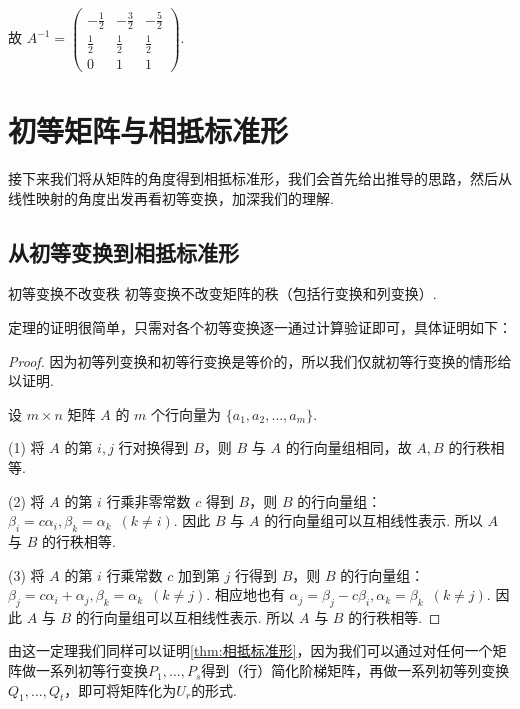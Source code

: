 \begin{solution}
    故 $A^{-1} =
        \begin{pmatrix}
            -\frac{1}{2} & -\frac{3}{2} & -\frac{5}{2} \\
            \frac{1}{2}  & \frac{1}{2}  & \frac{1}{2}  \\
            0            & 1            & 1
        \end{pmatrix}$.
\end{solution}

\section{初等矩阵与相抵标准形}

接下来我们将从矩阵的角度得到相抵标准形，我们会首先给出推导的思路，然后从线性映射的角度出发再看初等变换，加深我们的理解.

\subsection{从初等变换到相抵标准形}

\begin{theorem}{}{初等变换不改变秩}
    初等变换不改变矩阵的秩（包括行变换和列变换）.
\end{theorem}

定理的证明很简单，只需对各个初等变换逐一通过计算验证即可，具体证明如下：

\begin{proof}
    因为初等列变换和初等行变换是等价的，所以我们仅就初等行变换的情形给以证明.

    设 $m\times n$ 矩阵 $A$ 的 $m$ 个行向量为 $\{ a_1, a_2, \dots, a_m \}$.

    (1) 将 $A$ 的第 $i, j$ 行对换得到 $B$，则 $B$ 与 $A$ 的行向量组相同，故 $A, B$ 的行秩相等.

    (2) 将 $A$ 的第 $i$ 行乘非零常数 $c$ 得到 $B$，则 $B$ 的行向量组：$\beta_i = c\alpha_i, \beta_k = \alpha_k \enspace (k \neq i)$. 因此 $B$ 与 $A$ 的行向量组可以互相线性表示. 所以 $A$ 与 $B$ 的行秩相等.

    (3) 将 $A$ 的第 $i$ 行乘常数 $c$ 加到第 $j$ 行得到 $B$，则 $B$ 的行向量组：$\beta_j = c\alpha_i + \alpha_j,\allowbreak \beta_k = \alpha_k \enspace (k \neq j)$. 相应地也有 $\alpha_j = \beta_j - c\beta_i, \alpha_k = \beta_k \enspace (k \neq j)$. 因此 $A$ 与 $B$ 的行向量组可以互相线性表示. 所以 $A$ 与 $B$ 的行秩相等.
\end{proof}

由这一定理我们同样可以证明\autoref*{thm:相抵标准形}，因为我们可以通过对任何一个矩阵做一系列初等行变换$P_1,\ldots,P_s$得到（行）简化阶梯矩阵，再做一系列初等列变换$Q_1,\ldots,Q_t$，即可将矩阵化为$U_r$的形式.

